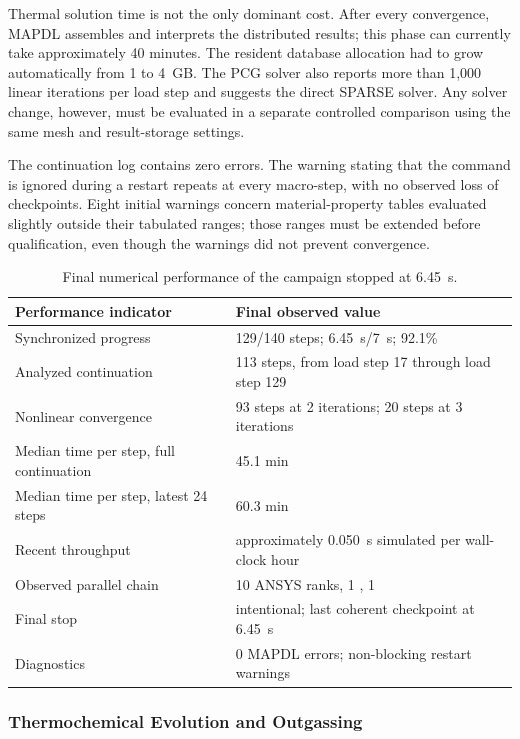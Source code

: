 \documentclass[oneside,openany]{amsdtx}
\begin{document}
Thermal solution time is not the only dominant cost. After every convergence,
MAPDL assembles and interprets the distributed results; this phase can
currently take approximately 40 minutes. The resident database allocation had
to grow automatically from 1 to 4~GB. The PCG solver also reports more than
1,000 linear iterations per load step and suggests the direct SPARSE solver.
Any solver change, however, must be evaluated in a separate controlled
comparison using the same mesh and result-storage settings.

The continuation log contains zero errors. The
 warning stating that the command is ignored during a
restart repeats at every macro-step, with no observed loss of checkpoints.
Eight initial warnings concern material-property tables evaluated slightly
outside their tabulated ranges; those ranges must be extended before
qualification, even though the warnings did not prevent convergence.

\begin{table}[H]
\centering
\small
\renewcommand{\arraystretch}{1.15}
\begin{tabular}{L{0.43\textwidth}L{0.43\textwidth}}
\toprule
\textbf{Performance indicator} & \textbf{Final observed value} \\
\midrule
Synchronized progress & 129/140 steps; \SI{6.45}{s}/\SI{7}{s}; 92.1\% \\
Analyzed continuation & 113 steps, from load step 17 through load step 129 \\
Nonlinear convergence & 93 steps at 2 iterations; 20 steps at 3 iterations \\
Median time per step, full continuation & 45.1 min \\
Median time per step, latest 24 steps & 60.3 min \\
Recent throughput & approximately \SI{0.050}{s} simulated per wall-clock hour \\
Observed parallel chain & 10 ANSYS ranks, 1 , 1  \\
Final stop & intentional; last coherent checkpoint at \SI{6.45}{s} \\
Diagnostics & 0 MAPDL errors; non-blocking restart warnings \\
\bottomrule
\end{tabular}
\caption{Final numerical performance of the campaign stopped at
\SI{6.45}{s}.}
\label{tab:sim2-performance}
\end{table}

\subsubsection{Thermochemical Evolution and Outgassing}
\end{document}
